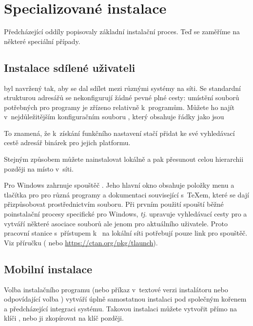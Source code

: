 \documentclass[\classoptions,slovak,english,czech]{\classname}
\begin{document}
\section{Specializované instalace}

Předcházející oddíly popisovaly základní instalační proces.
Teď se zaměříme na některé speciální případy.

\subsection{Instalace sdílené uživateli}
\label{sec:sharedinstall}

\TL{} byl navržený tak, aby se dal sdílet mezi různými systémy na síti. 
Se standardní strukturou adresářů se nekonfigurují žádné 
pevné plné cesty: umístění souborů potřebných pro programy \TL{}
je zřízeno relativně k~programům.  Můžete ho 
najít v~nejdůležitějším konfiguračním souboru
, který obsahuje řádky jako jsou
To znamená, že k~získání funkčního nastavení stačí 
přidat ke své vyhledávací cestě adresář binárek \TL{} 
pro jejich platformu.

Stejným způsobem můžete nainstalovat \TL{} lokálně a 
pak přesunout celou hierarchii později na místo v~síti.

Pro Windows \TL{} zahrnuje spouštěč . 
Jeho hlavní okno obsahuje položky menu a tlačítka pro 
pro různá programy a dokumentaci související s~\TeX{}em,
které se dají přizpůsobovat prostřednictvím  souboru.
Při prvním použití spouští běžné poinstalační procesy specifické pro Windows, 
\emph{tj.} upravuje vyhledávací cesty pro \TL{} a
vytváří některé asociace souborů ale jenom pro aktuálního uživatele. 
Proto pracovní stanice s~přístupem k~\TL{} na lokální síti 
potřebují pouze link pro spouštěč. Viz příručku 
 ( nebo
\url{https://ctan.org/pkg/tlaunch}).

\subsection{Mobilní \USB{} instalace}
\label{sec:portable-tl}

Volba instalačního programu  (nebo 
příkaz  v~textové verzi instalátoru nebo 
odpovídající volba \GUI{}) vytváří úplně samostatnou 
instalaci \TL{} pod společným kořenem a předcházející integraci systému. 
Takovou instalaci můžete vytvořit přímo na klíči \USB{}, 
nebo ji zkopírovat na klíč \USB{} později.
\end{document}
